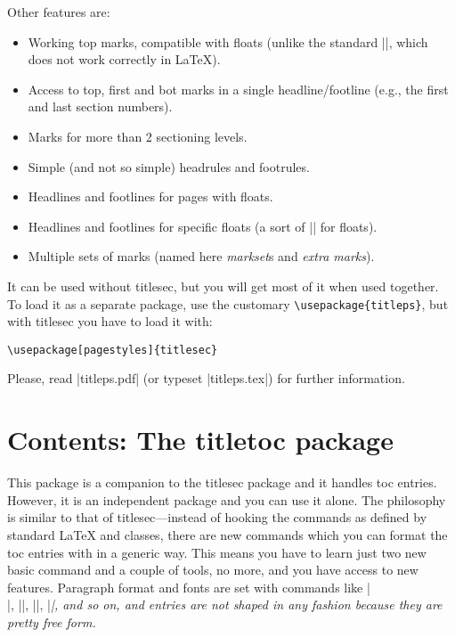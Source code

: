 \documentclass[a4paper]{ltxguide}
\begin{document}
Other features are:
\begin{itemize}
\item Working top marks, compatible with floats (unlike the standard 
|\topmark|, which does not work correctly in \LaTeX{}).
\item Access to top, first and bot marks in a single headline/footline
(e.g., the first and last section numbers).
\item Marks for more than 2 sectioning levels.
\item Simple (and not so simple) headrules and footrules.
\item Headlines and footlines for pages with floats.
\item Headlines and footlines for specific floats (a sort of 
|\thispagestyle| for floats).
\item Multiple sets of marks (named here \emph{markset}s and 
\textit{extra marks}).
\end{itemize}

It can be used without \textsf{titlesec}, but you will get most of 
it when used together.  To load it as a separate package, use the
customary \verb|\usepackage{titleps}|, but with \textsf{titlesec} you
have to load it with:
\begin{verbatim}
\usepackage[pagestyles]{titlesec}
\end{verbatim}

Please, read |titleps.pdf| (or typeset |titleps.tex|) for further 
information.

\section{Contents: The \textsf{titletoc} package}

This package is a companion to the \textsf{titlesec} package and it 
handles
toc entries. However, it is an independent package and you can use
it alone. The philosophy is similar to that of \textsf{titlesec}---instead
of hooking the commands as defined by standard \LaTeX{} and classes,
there are new commands which you can format the toc entries with
in a generic way. This means you have to learn just
two new basic command and a couple of tools, no more, and you have access 
to
new features. Paragraph format
and fonts are set with commands like |\\|, 
|\makebox|,
|\large|, |\itshape|, and so on, and entries are not shaped in any
fashion because they are pretty free form.
\end{document}
